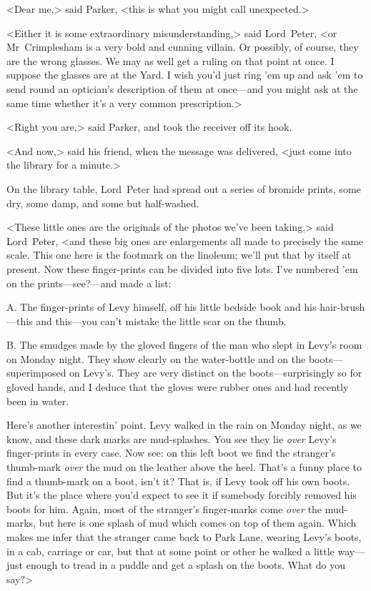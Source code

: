 <Dear me,> said Parker, <this is what you might call unexpected.>

<Either it is some extraordinary misunderstanding,> said Lord~Peter, <or Mr~Crimplesham is a very bold and cunning villain. Or possibly, of course, they are the wrong glasses. We may as well get a ruling on that point at once. I suppose the glasses are at the Yard. I wish you'd just ring 'em up and ask 'em to send round an optician's description of them at once—and you might ask at the same time whether it's a very common prescription.>

<Right you are,> said Parker, and took the receiver off its hook.

<And now,> said his friend, when the message was delivered, <just come into the library for a minute.>

On the library table, Lord~Peter had spread out a series of bromide prints, some dry, some damp, and some but half-washed.

<These little ones are the originals of the photos we've been taking,> said Lord~Peter, <and these big ones are enlargements all made to precisely the same scale. This one here is the footmark on the linoleum; we'll put that by itself at present. Now these finger-prints can be divided into five lots. I've numbered 'em on the prints—see?—and made a list:


{\large A.} The finger-prints of Levy himself, off his little bedside book and his hair-brush—this and this—you can't mistake the little scar on the thumb.

{\large B.} The smudges made by the gloved fingers of the man who slept in Levy's room on Monday night. They show clearly on the water-bottle and on the boots—superimposed on Levy's. They are very distinct on the boots—surprisingly so for gloved hands, and I deduce that the gloves were rubber ones and had recently been in water.

Here's another interestin' point. Levy walked in the rain on Monday night, as we know, and these dark marks are mud-splashes. You see they lie \emph{over} Levy's finger-prints in every case. Now see: on this left boot we find the stranger's thumb-mark \emph{over} the mud on the leather above the heel. That's a funny place to find a thumb-mark on a boot, isn't it? That is, if Levy took off his own boots. But it's the place where you'd expect to see it if somebody forcibly removed his boots for him. Again, most of the stranger's finger-marks come \emph{over} the mud-marks, but here is one splash of mud which comes on top of them again. Which makes me infer that the stranger came back to Park Lane, wearing Levy's boots, in a cab, carriage or car, but that at some point or other he walked a little way—just enough to tread in a puddle and get a splash on the boots. What do you say?>

